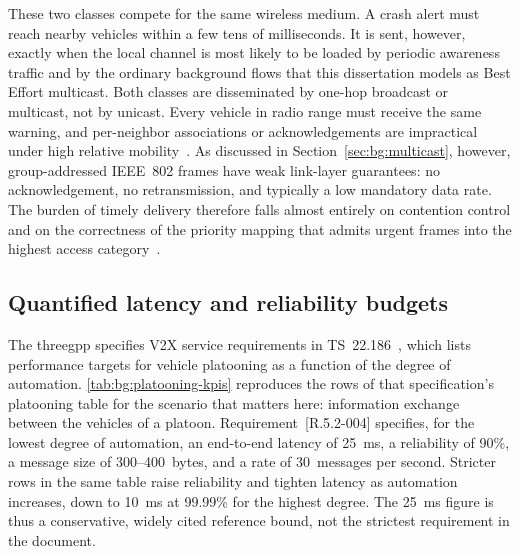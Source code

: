 These two classes compete for the same wireless medium.
A crash alert must reach nearby vehicles within a few tens of milliseconds.
It is sent, however, exactly when the local channel is most likely to be loaded by periodic awareness traffic and by the ordinary background flows that this dissertation models as Best Effort multicast.
Both classes are disseminated by one-hop broadcast or multicast, not by unicast.
Every vehicle in radio range must receive the same warning, and per-neighbor associations or acknowledgements are impractical under high relative mobility~\cite{Continuous_Backoff_Freezing_Li}.
As discussed in Section~\ref{sec:bg:multicast}, however, group-addressed IEEE~802 frames have weak link-layer guarantees: no acknowledgement, no retransmission, and typically a low mandatory data rate. The burden of timely delivery therefore falls almost entirely on contention control and on the correctness of the priority mapping that admits urgent frames into the highest access category~\cite{RFC9119_Multicast_IEEE802_Wireless}.

\subsection{Quantified latency and reliability budgets}
\label{sec:bg:budgets}

The \gls{threegpp} specifies V2X service requirements in TS~22.186~\cite{ts22186}, which lists performance targets for vehicle platooning as a function of the degree of automation.
\autoref{tab:bg:platooning-kpis} reproduces the rows of that specification's platooning table for the scenario that matters here: information exchange between the vehicles of a platoon.
Requirement~[R.5.2-004] specifies, for the lowest degree of automation, an end-to-end latency of \SI{25}{\milli\second}, a reliability of 90\%, a message size of 300--400~bytes, and a rate of 30~messages per second.
Stricter rows in the same table raise reliability and tighten latency as automation increases, down to \SI{10}{\milli\second} at 99.99\% for the highest degree.
The \SI{25}{\milli\second} figure is thus a conservative, widely cited reference bound, not the strictest requirement in the document.

